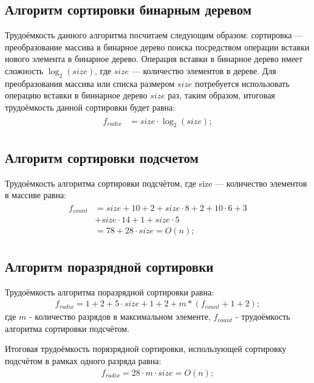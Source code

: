 \subsection{Алгоритм сортировки бинарным деревом}

Трудоёмкость данного алгоритма посчитаем следующим образом: сортировка --- преобразование массива в бинарное дерево поиска посредством операции вставки нового элемента в бинарное дерево.
Операция вставки в бинарное дерево имеет сложность $ \log_{2}(size)$, где $size$ --- количество элементов в дереве.
Для преобразования массива или списка размером $size$ потребуется использовать операцию вставки в биннарное дерево $size$ раз, таким образом, итоговая трудоёмкость данной сортировки будет равна:
\begin{align}
	\begin{split}
		\label{for:binary_sort_perf}
		f_{radix} &= size \cdot \log_{2}(size);
	\end{split}
\end{align}


\subsection{Алгоритм сортировки подсчетом}

Трудоёмкость алгоритма сортировки подсчётом, где size --- количество элементов в массиве равна:
\begin{align}
	\begin{split}
		\label{for:count_sort_perf}
		f_{count} &= size + 10  + 2 + size \cdot 8 + 2 + 10 \cdot 6 + 3 \\
		&+ size \cdot 14 + 1 + size \cdot 5 \\
		&= 78 + 28 \cdot size = O(n);
	\end{split}
\end{align}

\subsection{Алгоритм поразрядной сортировки}

Трудоёмкость алгоритма поразрядной сортировки равна:
\begin{align}
	\label{for:radix_sort_perf}
	f_{radix} = 1 + 2 + 5 \cdot size + 1 + 2 + m * (f_{count} + 1 + 2);
\end{align}
где $m$ - количество разрядов в максимальном элементе, $f_{count}$ - трудоёмкость алгоритма сортировки подсчётом.

Итоговая трудоёмкость порязрядной сортировки, использующей сортировку подсчётом в рамках одного разряда равна:
\begin{align}
	f_{radix} = 28 \cdot m \cdot size = O(n);
\end{align}

